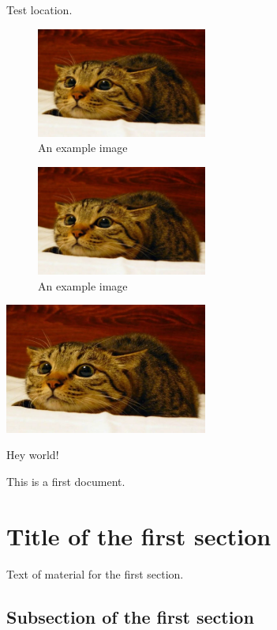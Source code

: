 \documentclass{article}
\begin{document}
\lipsum[1-4] %
Test location.
\begin{figure}[ht]
\centering
\includegraphics[width=0.5\textwidth]{cat}
\caption{An example image}
\end{figure}
\lipsum[6-10] %

\lipsum[1-7]
\begin{figure}[H]
\centering
\includegraphics[width=0.5\textwidth]{cat}
\caption{An example image}
\end{figure}
\lipsum[8-15]

\begin{image}
\centering
\includegraphics[width=0.5\textwidth]{cat}
\caption{An example image}
\end{image}

Hey world!

This is a first document.

\section{Title of the first section}

Text of material for the first section.

\subsection{Subsection of the first section}
\label{subsec:labelone}
\end{document}
